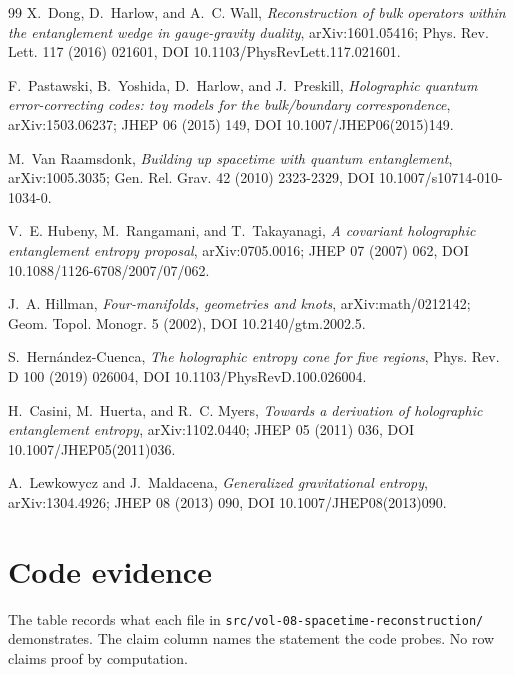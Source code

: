 \documentclass[11pt,letterpaper]{article}
\theoremstyle{definition}
\theoremstyle{remark}
\begin{document}
\begin{thebibliography}{99}
X.~Dong, D.~Harlow, and A.~C. Wall, \emph{Reconstruction of bulk operators within the entanglement wedge in gauge-gravity duality}, arXiv:1601.05416; Phys. Rev. Lett. 117 (2016) 021601, DOI 10.1103/PhysRevLett.117.021601.

F.~Pastawski, B.~Yoshida, D.~Harlow, and J.~Preskill, \emph{Holographic quantum error-correcting codes: toy models for the bulk/boundary correspondence}, arXiv:1503.06237; JHEP 06 (2015) 149, DOI 10.1007/JHEP06(2015)149.

M.~Van Raamsdonk, \emph{Building up spacetime with quantum entanglement}, arXiv:1005.3035; Gen. Rel. Grav. 42 (2010) 2323-2329, DOI 10.1007/s10714-010-1034-0.

V.~E. Hubeny, M.~Rangamani, and T.~Takayanagi, \emph{A covariant holographic entanglement entropy proposal}, arXiv:0705.0016; JHEP 07 (2007) 062, DOI 10.1088/1126-6708/2007/07/062.

J.~A. Hillman, \emph{Four-manifolds, geometries and knots}, arXiv:math/0212142; Geom. Topol. Monogr. 5 (2002), DOI 10.2140/gtm.2002.5.

S.~Hern\'{a}ndez-Cuenca, \emph{The holographic entropy cone for five regions}, Phys. Rev. D 100 (2019) 026004, DOI 10.1103/PhysRevD.100.026004.

H.~Casini, M.~Huerta, and R.~C. Myers, \emph{Towards a derivation of holographic entanglement entropy}, arXiv:1102.0440; JHEP 05 (2011) 036, DOI 10.1007/JHEP05(2011)036.

A.~Lewkowycz and J.~Maldacena, \emph{Generalized gravitational entropy}, arXiv:1304.4926; JHEP 08 (2013) 090, DOI 10.1007/JHEP08(2013)090.

\end{thebibliography}

\appendix
\section{Code evidence}

The table records what each file in \texttt{src/vol-08-spacetime-reconstruction/} demonstrates. The claim column names the statement the code probes. No row claims proof by computation.
\end{document}
